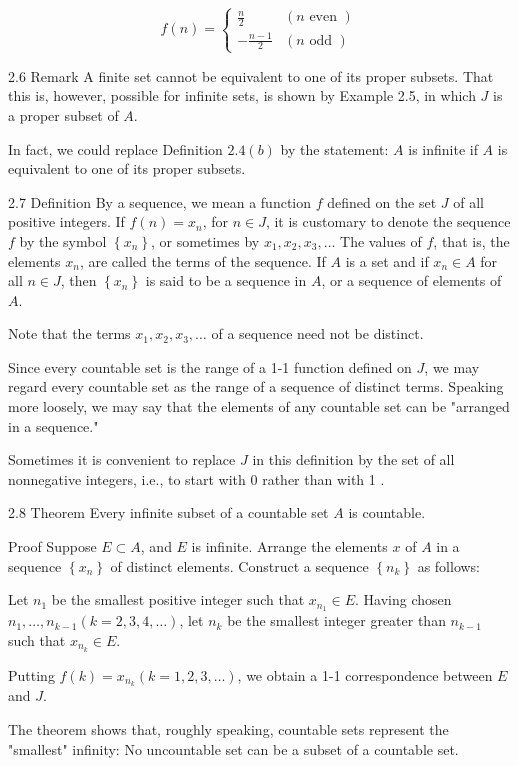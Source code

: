 \documentclass[10pt]{article}
\begin{document}
$$
f(n)= \begin{cases}\frac{n}{2} & (n \text { even }) \\ -\frac{n-1}{2} & (n \text { odd })\end{cases}
$$

2.6 Remark A finite set cannot be equivalent to one of its proper subsets. That this is, however, possible for infinite sets, is shown by Example 2.5, in which $J$ is a proper subset of $A$.

In fact, we could replace Definition $2.4(b)$ by the statement: $A$ is infinite if $A$ is equivalent to one of its proper subsets.

2.7 Definition By a sequence, we mean a function $f$ defined on the set $J$ of all positive integers. If $f(n)=x_{n}$, for $n \in J$, it is customary to denote the sequence $f$ by the symbol $\left\{x_{n}\right\}$, or sometimes by $x_{1}, x_{2}, x_{3}, \ldots$ The values of $f$, that is, the elements $x_{n}$, are called the terms of the sequence. If $A$ is a set and if $x_{n} \in A$ for all $n \in J$, then $\left\{x_{n}\right\}$ is said to be a sequence in $A$, or a sequence of elements of $A$.

Note that the terms $x_{1}, x_{2}, x_{3}, \ldots$ of a sequence need not be distinct.

Since every countable set is the range of a 1-1 function defined on $J$, we may regard every countable set as the range of a sequence of distinct terms. Speaking more loosely, we may say that the elements of any countable set can be "arranged in a sequence."

Sometimes it is convenient to replace $J$ in this definition by the set of all nonnegative integers, i.e., to start with 0 rather than with 1 .

2.8 Theorem Every infinite subset of a countable set $A$ is countable.

Proof Suppose $E \subset A$, and $E$ is infinite. Arrange the elements $x$ of $A$ in a sequence $\left\{x_{n}\right\}$ of distinct elements. Construct a sequence $\left\{n_{k}\right\}$ as follows:

Let $n_{1}$ be the smallest positive integer such that $x_{n_{1}} \in E$. Having chosen $n_{1}, \ldots, n_{k-1}(k=2,3,4, \ldots)$, let $n_{k}$ be the smallest integer greater than $n_{k-1}$ such that $x_{n_{k}} \in E$.

Putting $f(k)=x_{n_{k}}(k=1,2,3, \ldots)$, we obtain a 1-1 correspondence between $E$ and $J$.

The theorem shows that, roughly speaking, countable sets represent the "smallest" infinity: No uncountable set can be a subset of a countable set.
\end{document}
